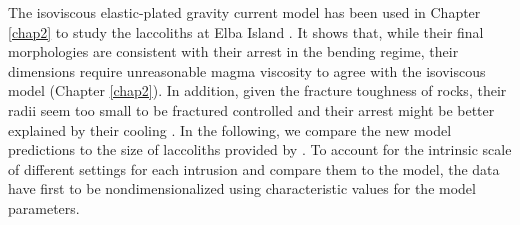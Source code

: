The isoviscous elastic-plated  gravity current model has  been used in
Chapter   \ref{chap2}  to   study  the   laccoliths  at   Elba  Island
\citep{Michaut:2011kg}. It shows that,  while their final morphologies
are  consistent  with  their  arrest  in  the  bending  regime,  their
dimensions  require unreasonable  magma  viscosity to  agree with  the
isoviscous  model  (Chapter  \ref{chap2}).   In  addition,  given  the
fracture  toughness  of  rocks,  their  radii seem  too  small  to  be
fractured controlled  and their  arrest might  be better  explained by
their cooling  \citep{Michaut:2011kg}.  In  the following,  we compare
the  new model  predictions  to  the size  of  laccoliths provided  by
\citet{Rocchi:2002jy}.   To   account  for  the  intrinsic   scale  of
different settings for  each intrusion and compare them  to the model,
the  data have  first  to be  nondimensionalized using  characteristic
values for the model parameters.

